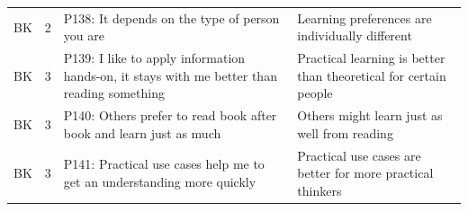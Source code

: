 \begin{table}[H]
\begin{tabularx}{\textwidth}{ll|X|p{4.5cm}}
	BK & 2 & P138: It depends on the type of person you are & Learning preferences are individually different \\  
	BK & 3 & P139: I like to apply information hands-on, it stays with me better than reading something & Practical learning is better than theoretical for certain people \\  
	BK & 3 & P140: Others prefer to read book after book and learn just as much & Others might learn just as well from reading \\ 
	BK & 3 & P141: Practical use cases help me to get an understanding more quickly & Practical use cases are better for more practical thinkers \\  
\end{tabularx}
\end{table}

